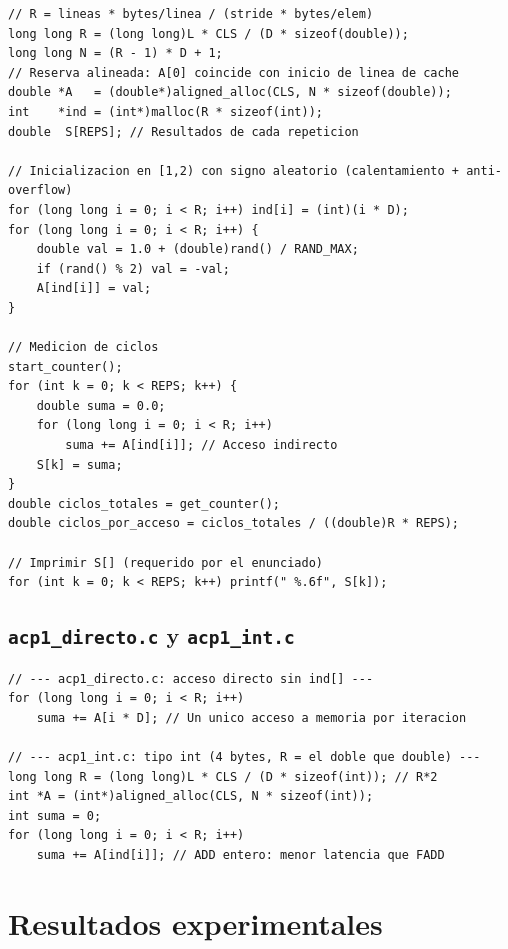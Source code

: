 \documentclass[12pt,a4paper]{article}
\begin{document}
\begin{lstlisting}[caption={Cálculo de R y bucle de medición (acp1.c)}, label=lst:acp1]
// R = lineas * bytes/linea / (stride * bytes/elem)
long long R = (long long)L * CLS / (D * sizeof(double));
long long N = (R - 1) * D + 1;
// Reserva alineada: A[0] coincide con inicio de linea de cache
double *A   = (double*)aligned_alloc(CLS, N * sizeof(double));
int    *ind = (int*)malloc(R * sizeof(int));
double  S[REPS]; // Resultados de cada repeticion

// Inicializacion en [1,2) con signo aleatorio (calentamiento + anti-overflow)
for (long long i = 0; i < R; i++) ind[i] = (int)(i * D);
for (long long i = 0; i < R; i++) {
    double val = 1.0 + (double)rand() / RAND_MAX;
    if (rand() % 2) val = -val;
    A[ind[i]] = val;
}

// Medicion de ciclos
start_counter();
for (int k = 0; k < REPS; k++) {
    double suma = 0.0;
    for (long long i = 0; i < R; i++)
        suma += A[ind[i]]; // Acceso indirecto
    S[k] = suma;
}
double ciclos_totales = get_counter();
double ciclos_por_acceso = ciclos_totales / ((double)R * REPS);

// Imprimir S[] (requerido por el enunciado)
for (int k = 0; k < REPS; k++) printf(" %.6f", S[k]);
\end{lstlisting}

\subsection{\texttt{acp1\_directo.c} y \texttt{acp1\_int.c}}

\begin{lstlisting}[caption={Diferencias clave de las variantes adicionales}, label=lst:variantes]
// --- acp1_directo.c: acceso directo sin ind[] ---
for (long long i = 0; i < R; i++)
    suma += A[i * D]; // Un unico acceso a memoria por iteracion

// --- acp1_int.c: tipo int (4 bytes, R = el doble que double) ---
long long R = (long long)L * CLS / (D * sizeof(int)); // R*2
int *A = (int*)aligned_alloc(CLS, N * sizeof(int));
int suma = 0;
for (long long i = 0; i < R; i++)
    suma += A[ind[i]]; // ADD entero: menor latencia que FADD
\end{lstlisting}

\section{Resultados experimentales}
\end{document}
